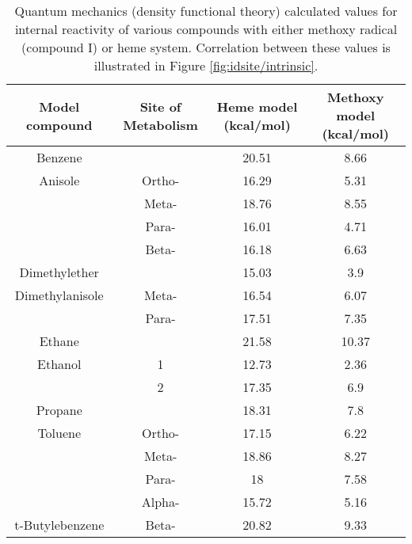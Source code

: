 \begin{table}[h]
\centering
\begin{tabular}{cccc}
\hline
Model compound & Site of Metabolism & Heme model (kcal/mol) & Methoxy model (kcal/mol) \\
\hline
Benzene &  & 20.51 & 8.66 \\
Anisole & Ortho- & 16.29 & 5.31 \\
 & Meta- & 18.76 & 8.55 \\
 & Para- & 16.01 & 4.71 \\
 & Beta- & 16.18 & 6.63 \\
Dimethylether &  & 15.03 & 3.9 \\
Dimethylanisole & Meta- & 16.54 & 6.07 \\
 & Para- & 17.51 & 7.35 \\
Ethane &  & 21.58 & 10.37 \\
Ethanol & 1 & 12.73 & 2.36 \\
 & 2 & 17.35 & 6.9 \\
Propane &  & 18.31 & 7.8 \\
Toluene & Ortho- & 17.15 & 6.22 \\
 & Meta- & 18.86 & 8.27 \\
 & Para- & 18 & 7.58 \\
 & Alpha- & 15.72 & 5.16 \\
t-Butylebenzene & Beta- & 20.82 & 9.33 \\
\hline
\end{tabular}
\caption{Quantum mechanics (density functional theory) calculated values for internal reactivity of various compounds with either methoxy radical (compound I) or heme system.
Correlation between these values is illustrated in Figure \ref{fig:idsite/intrinsic}.}
\label{table:heme_methoxy}
\end{table}
